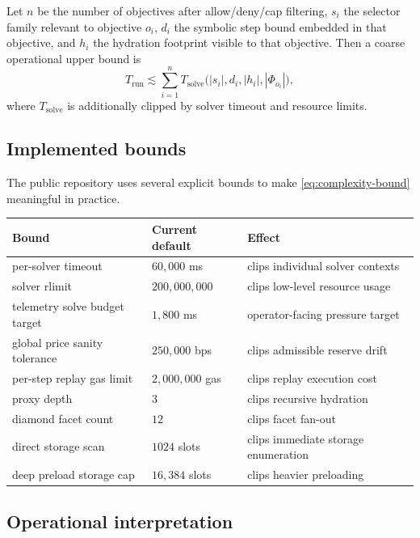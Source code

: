\documentclass[11pt]{article}
\numberwithin{equation}{section}
\theoremstyle{remark}
\begin{document}
Let \(n\) be the number of objectives after allow/deny/cap filtering, \(s_i\) the selector family relevant to objective \(o_i\), \(d_i\) the symbolic step bound embedded in that objective, and \(h_i\) the hydration footprint visible to that objective. Then a coarse operational upper bound is
\begin{equation}
\label{eq:complexity-bound}
T_{\mathrm{run}}
\lesssim
\sum_{i=1}^{n}
T_{\mathrm{solve}}
\big(
|s_i|,
d_i,
|h_i|,
|\Phi_{o_i}|
\big),
\end{equation}
where \(T_{\mathrm{solve}}\) is additionally clipped by solver timeout and resource limits.

\subsection{Implemented bounds}

The public repository uses several explicit bounds to make \cref{eq:complexity-bound} meaningful in practice.
\begin{center}
\begin{tabular}{lll}
\toprule
Bound & Current default & Effect \\
\midrule
per-solver timeout & \(60{,}000\) ms & clips individual solver contexts \\
solver rlimit & \(200{,}000{,}000\) & clips low-level resource usage \\
telemetry solve budget target & \(1{,}800\) ms & operator-facing pressure target \\
global price sanity tolerance & \(250{,}000\) bps & clips admissible reserve drift \\
per-step replay gas limit & \(2{,}000{,}000\) gas & clips replay execution cost \\
proxy depth & \(3\) & clips recursive hydration \\
diamond facet count & \(12\) & clips facet fan-out \\
direct storage scan & \(1024\) slots & clips immediate storage enumeration \\
deep preload storage cap & \(16{,}384\) slots & clips heavier preloading \\
\bottomrule
\end{tabular}
\end{center}

\subsection{Operational interpretation}
\end{document}
